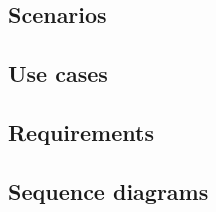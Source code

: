 \subsection{Scenarios}


\subsection{Use cases}


\subsection{Requirements}


\subsection{Sequence diagrams}

